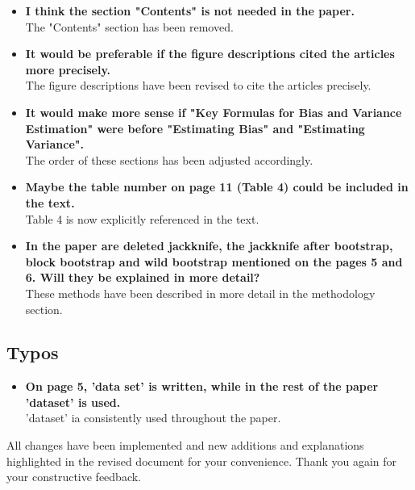 \documentclass[aodsor,preprint]{imsart}
\numberwithin{equation}{section}
\theoremstyle{plain}
\begin{document}
\begin{itemize}
    \item \textbf{I think the section "Contents" is not needed in the paper.}\\
    The "Contents" section has been removed.
    
    \item \textbf{It would be preferable if the figure descriptions cited the articles more precisely.}\\
    The figure descriptions have been revised to cite the articles precisely.
    
    \item \textbf{It would make more sense if "Key Formulas for Bias and Variance Estimation" were before "Estimating Bias" and "Estimating Variance".}\\
    The order of these sections has been adjusted accordingly.
    
    \item \textbf{Maybe the table number on page 11 (Table 4) could be included in the text.}\\
    Table 4 is now explicitly referenced in the text.
    
    \item \textbf{In the paper are deleted jackknife, the jackknife after bootstrap, block bootstrap and wild bootstrap mentioned on the pages 5 and 6. Will they be explained in more detail?}\\
    These methods have been described in more detail in the methodology section.
\end{itemize}

\subsection*{Typos}

\begin{itemize}
    \item \textbf{On page 5, 'data set' is written, while in the rest of the paper 'dataset' is used.}\\
     'dataset' ia consistently used throughout the paper.
\end{itemize}

All changes have been implemented and new additions and explanations highlighted in the revised document for your convenience. Thank you again for your constructive feedback.
\end{document}
